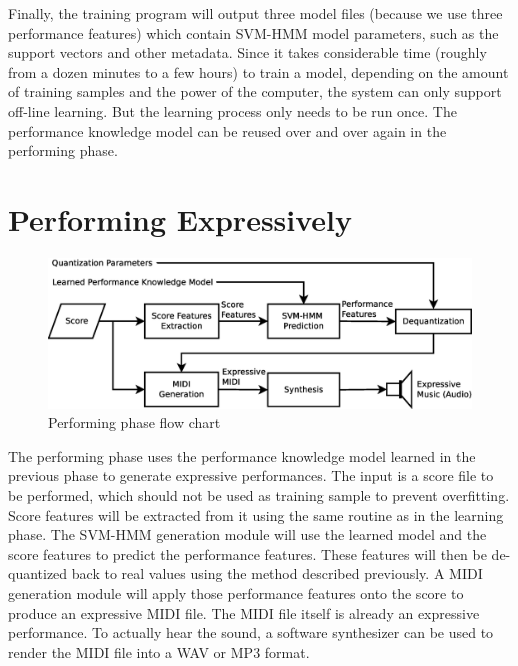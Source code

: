 Finally, the training program will output three model files (because we use three performance features) which contain SVM-HMM model parameters, such as the support vectors and other metadata. Since it takes considerable time (roughly from a dozen minutes to a few hours) to train a model, depending on the amount of training samples and the power of the computer, the system can only support off-line learning. But the learning process only needs to be run once. The performance knowledge model can be reused over and over again in the performing phase.



\section{Performing Expressively}
   \begin{figure}[tp]
      \begin{center}
         \includegraphics[width=\textwidth]{fig/perf_arch}
      \end{center}
      \caption{Performing phase flow chart} 
      \label{fig:perfflow}
   \end{figure}
The performing phase uses the performance knowledge model learned in the previous phase to generate expressive performances. The input is a score file to be performed, which should not be used as training sample to prevent overfitting. Score features will be extracted from it using the same routine as in the learning phase. The SVM-HMM generation module will use the learned model and the score features to predict the performance features. These features will then be de-quantized back to real values using the method described previously. A MIDI generation module will apply those performance features onto the score to produce an expressive MIDI file. The MIDI file itself is already an expressive performance. To actually hear the sound, a software synthesizer can be used to render the MIDI file into a WAV or MP3 format.
